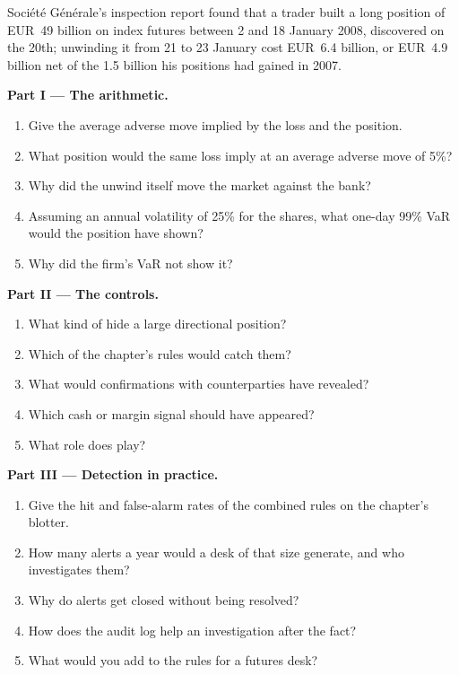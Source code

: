 \begin{problem}\label{pb:rc:operational-risk-and-rogue-trading:1}
Société Générale's inspection report found that a trader built a long position of EUR~49 billion on
index futures between 2 and 18 January 2008, discovered on the 20th; unwinding it from 21 to 23 January
cost EUR~6.4 billion, or EUR~4.9 billion net of the 1.5 billion his positions had gained in 2007.

\medskip\noindent\textbf{Part I --- The arithmetic.}
\begin{enumerate}
\item Give the average adverse move implied by the loss and the position.
\item What position would the same loss imply at an average adverse move of 5\%?
\item Why did the unwind itself move the market against the bank?
\item Assuming an annual volatility of 25\% for the shares, what one-day 99\% VaR would the position
have shown?
\item Why did the firm's VaR not show it?
\end{enumerate}

\medskip\noindent\textbf{Part II --- The controls.}
\begin{enumerate}[resume]
\item What kind of  hide a large directional position?
\item Which of the chapter's rules would catch them?
\item What would confirmations with counterparties have revealed?
\item Which cash or margin signal should have appeared?
\item What role does  play?
\end{enumerate}

\medskip\noindent\textbf{Part III --- Detection in practice.}
\begin{enumerate}[resume]
\item Give the hit and false-alarm rates of the combined rules on the chapter's blotter.
\item How many alerts a year would a desk of that size generate, and who investigates them?
\item Why do alerts get closed without being resolved?
\item How does the audit log help an investigation after the fact?
\item What would you add to the rules for a futures desk?
\end{enumerate}


\end{problem}
